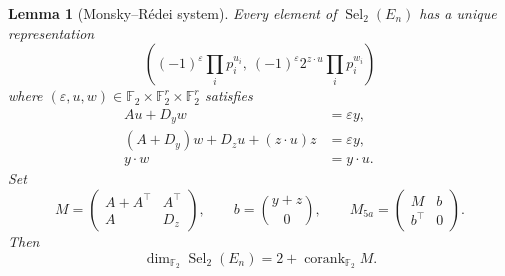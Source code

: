 \documentclass[11pt,a4paper]{article}
\newtheorem{lemma}[theorem]{Lemma}
\theoremstyle{definition}
\newcommand{\FF}{\mathbb F_2}
\newcommand{\corank}{\operatorname{corank}}
\newcommand{\Sel}{\operatorname{Sel}_2}
\begin{document}
\begin{lemma}[Monsky--R\'edei system]\label{lem:selmer}
Every element of $\Sel(E_n)$ has a unique representation
\[
 \left((-1)^\varepsilon\prod_i p_i^{u_i},\ 
       (-1)^\varepsilon 2^{z\cdot u}\prod_i p_i^{w_i}\right)
\]
where $(\varepsilon,u,w)\in\FF\times\FF^r\times\FF^r$ satisfies
\begin{align}
 Au+D_y w&=\varepsilon y,                                      &&\tag{S1}\label{eq:S1}\\
 (A+D_y)w+D_z u+(z\cdot u)z&=\varepsilon y,                    &&\tag{S2}\label{eq:S2}\\
 y\cdot w&=y\cdot u.                                             &&\tag{S3}\label{eq:S3}
\end{align}
Set
\begin{equation}\label{eq:M}
 M=\begin{pmatrix}A+A^\top&A^\top\\ A&D_z\end{pmatrix},\qquad
 b=\binom{y+z}{0},\qquad
 M_{5a}=\begin{pmatrix}M&b\\b^\top&0\end{pmatrix}.
\end{equation}
Then
\begin{equation}\label{eq:Selrank}
                \dim_{\FF}\Sel(E_n)=2+\corank_{\FF}M.
\end{equation}
\end{lemma}
\end{document}
